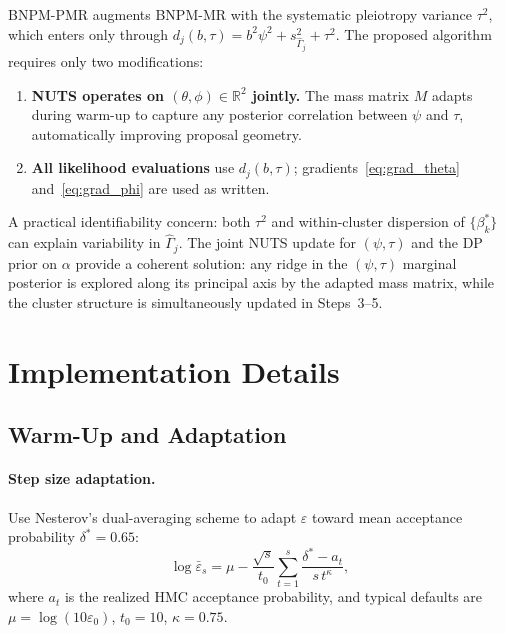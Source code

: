 \documentclass[12pt, a4paper]{article}
\theoremstyle{remark}
\newcommand{\R}{\mathbb{R}}
\begin{document}
BNPM-PMR augments BNPM-MR with the systematic pleiotropy variance
$\tau^2$, which enters only through
$d_j(b,\tau) = b^2\psi^2 + s^2_{\hat\Gamma_j} + \tau^2$.
The proposed algorithm requires only two modifications:
\begin{enumerate}[leftmargin=*, itemsep=4pt]
  \item \textbf{NUTS operates on $(\theta,\phi) \in \R^2$ jointly.}
        The mass matrix $M$ adapts during warm-up to capture any
        posterior correlation between $\psi$ and $\tau$, automatically
        improving proposal geometry.
  \item \textbf{All likelihood evaluations} use $d_j(b,\tau)$;
        gradients~\eqref{eq:grad_theta} and~\eqref{eq:grad_phi} are
        used as written.
\end{enumerate}
A practical identifiability concern: both $\tau^2$ and within-cluster
dispersion of $\{\beta_k^*\}$ can explain variability in $\hat\Gamma_j$.
The joint NUTS update for $(\psi,\tau)$ and the DP prior on $\alpha$
provide a coherent solution: any ridge in the $(\psi,\tau)$ marginal
posterior is explored along its principal axis by the adapted mass
matrix, while the cluster structure is simultaneously updated in
Steps~3--5.

\section{Implementation Details}
\label{sec:impl}

\subsection{Warm-Up and Adaptation}
\label{sec:adaptation}

\paragraph{Step size adaptation.}
Use Nesterov's dual-averaging scheme \cite{Nesterov2009} to adapt
$\varepsilon$ toward mean acceptance probability $\delta^* = 0.65$:
\begin{equation}
  \log\bar\varepsilon_s
  = \mu - \frac{\sqrt{s}}{t_0}
    \sum_{t=1}^s \frac{\delta^* - a_t}{s\,t^\kappa},
\end{equation}
where $a_t$ is the realized HMC acceptance probability, and typical
defaults are $\mu = \log(10\varepsilon_0)$, $t_0 = 10$, $\kappa = 0.75$.
\end{document}
